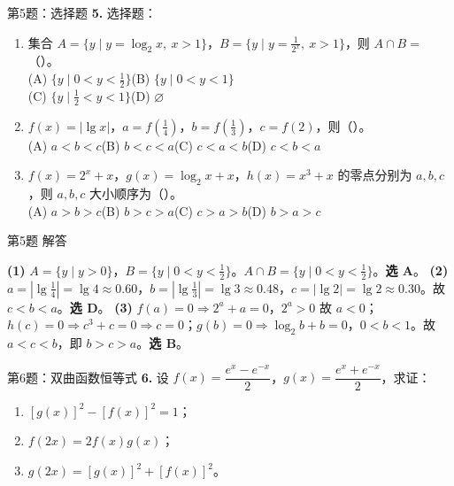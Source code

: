 \documentclass[10pt,aspectratio=169,serif]{beamer}
\begin{document}
\begin{frame}[t]{第5题：选择题}
\textbf{5.} 选择题：
\begin{enumerate}[(1)]
  \item 集合 $A=\{y\mid y=\log_{2}x,\ x>1\}$，$B=\{y\mid y=\tfrac{1}{2^{x}},\ x>1\}$，则 $A\cap B=$（\quad）。\\
  (A) $\{y\mid 0<y<\tfrac12\}$\quad (B) $\{y\mid 0<y<1\}$\\
  (C) $\{y\mid \tfrac12<y<1\}$\quad (D) $\varnothing$
  \item $f(x)=|\lg x|$，$a=f(\tfrac14)$，$b=f(\tfrac13)$，$c=f(2)$，则（\quad）。\\
  (A) $a<b<c$\quad (B) $b<c<a$\quad (C) $c<a<b$\quad (D) $c<b<a$
  \item $f(x)=2^{x}+x$，$g(x)=\log_{2}x+x$，$h(x)=x^{3}+x$ 的零点分别为 $a,b,c$，则 $a,b,c$ 大小顺序为（\quad）。\\
  (A) $a>b>c$\quad (B) $b>c>a$\quad (C) $c>a>b$\quad (D) $b>a>c$
\end{enumerate}
\end{frame}

\begin{frame}[t]{第5题 解答}
\begin{tcolorbox}[colback=orange!10,colframe=orange,title=\textbf{解}]
\textbf{(1)} $A=\{y\mid y>0\}$，$B=\{y\mid 0<y<\tfrac12\}$。$A\cap B=\{y\mid 0<y<\tfrac12\}$。\textbf{选 A}。
\smallskip
\textbf{(2)} $a=|\lg\tfrac14|=\lg 4\approx 0.60$，$b=|\lg\tfrac13|=\lg 3\approx 0.48$，$c=|\lg 2|=\lg 2\approx 0.30$。故 $c<b<a$。\textbf{选 D}。
\smallskip
\textbf{(3)} $f(a)=0\Rightarrow 2^{a}+a=0$，$2^{a}>0$ 故 $a<0$；$h(c)=0\Rightarrow c^{3}+c=0\Rightarrow c=0$；$g(b)=0\Rightarrow \log_{2}b+b=0$，$0<b<1$。故 $a<c<b$，即 $b>c>a$。\textbf{选 B}。
\end{tcolorbox}
\end{frame}

\begin{frame}[t]{第6题：双曲函数恒等式}
\textbf{6.} 设 $f(x)=\dfrac{e^{x}-e^{-x}}{2}$，$g(x)=\dfrac{e^{x}+e^{-x}}{2}$，求证：
\begin{enumerate}[(1)]
  \item $[g(x)]^{2}-[f(x)]^{2}=1$；
  \item $f(2x)=2f(x)g(x)$；
  \item $g(2x)=[g(x)]^{2}+[f(x)]^{2}$。
\end{enumerate}
\end{frame}
\end{document}
